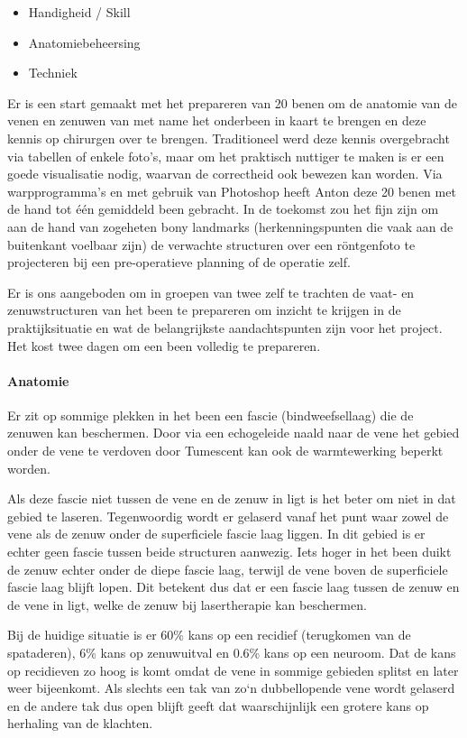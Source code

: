 \begin{itemize}
	\item Handigheid / Skill 
	\item Anatomiebeheersing 
	\item Techniek 
\end{itemize}

Er is een start gemaakt met het prepareren van 20 benen om de anatomie van de venen en zenuwen van met name het onderbeen in kaart te brengen en deze kennis op chirurgen over te brengen.
Traditioneel werd deze kennis overgebracht via tabellen of enkele foto's, maar om het praktisch nuttiger te maken is er een goede visualisatie nodig, waarvan de correctheid ook bewezen kan worden.
Via warpprogramma's en met gebruik van Photoshop heeft Anton deze 20 benen met de hand tot \'e\'en gemiddeld been gebracht.
In de toekomst zou het fijn zijn om aan de hand van zogeheten bony landmarks (herkenningspunten die vaak aan de buitenkant voelbaar zijn) de verwachte structuren over een r\"ontgenfoto te projecteren bij een pre-operatieve planning of de operatie zelf. 

Er is ons aangeboden om in groepen van twee zelf te trachten de vaat- en zenuwstructuren van het been te prepareren om inzicht te krijgen in de praktijksituatie en wat de belangrijkste aandachtspunten zijn voor het project. Het kost twee dagen om een been volledig te prepareren. 

\paragraph{Anatomie}
Er zit op sommige plekken in het been een fascie (bindweefsellaag) die de zenuwen kan beschermen.
Door via een echogeleide naald naar de vene het gebied onder de vene te verdoven door Tumescent kan ook de warmtewerking beperkt worden.

Als deze fascie niet tussen de vene en de zenuw in ligt is het beter om niet in dat gebied te laseren.
Tegenwoordig wordt er gelaserd vanaf het punt waar zowel de vene als de zenuw onder de superficiele fascie laag liggen.
In dit gebied is er echter geen fascie tussen beide structuren aanwezig.
Iets hoger in het been duikt de zenuw echter onder de diepe fascie laag, terwijl de vene boven de superficiele fascie laag blijft lopen.
Dit betekent dus dat er een fascie laag tussen de zenuw en de vene in ligt, welke de zenuw bij lasertherapie kan beschermen.

Bij de huidige situatie is er 60\% kans op een recidief (terugkomen van de spataderen), 6\% kans op zenuwuitval en 0.6\% kans op een neuroom.
Dat de kans op recidieven zo hoog is komt omdat de vene in sommige gebieden splitst en later weer bijeenkomt.
Als slechts een tak van zo`n dubbellopende vene wordt gelaserd en de andere tak dus open blijft geeft dat waarschijnlijk een grotere kans op herhaling van de klachten. 


